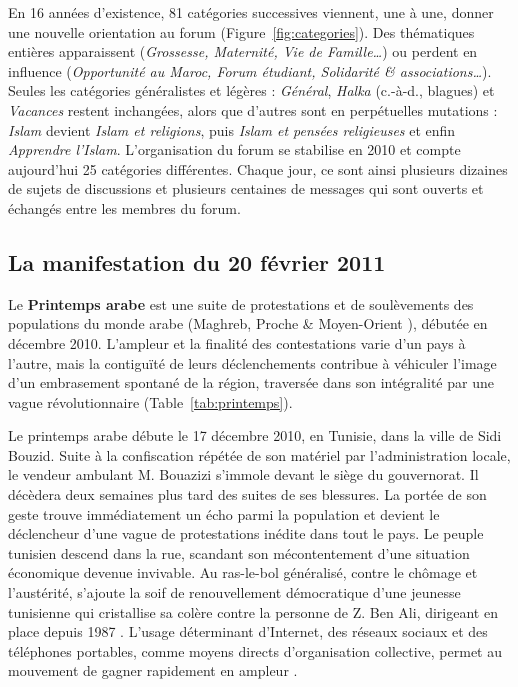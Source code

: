 \documentclass[symmetric,justified,marginals=raggedouter]{tufte-book}
\begin{document}
En 16 années d'existence, 81 catégories successives viennent, une à une, donner une nouvelle orientation au forum (Figure~\ref{fig:categories}). Des thématiques entières apparaissent (\textit{Grossesse, Maternité, Vie de Famille\ldots{}}) ou perdent en influence (\textit{Opportunité au Maroc, Forum étudiant, Solidarité \& associations\ldots{}}). Seules les catégories généralistes et légères : \textit{Général}, \textit{Halka} (c.-à-d., blagues) et \textit{Vacances} restent inchangées, alors que d'autres sont en perpétuelles mutations : \textit{Islam} devient \textit{Islam et religions}, puis \textit{Islam et pensées religieuses} et enfin \textit{Apprendre l'Islam}. L'orga\-nisation du forum se stabilise en 2010 et compte aujourd'hui 25 catégories différentes. Chaque jour, ce sont ainsi plusieurs dizaines de sujets de discussions et plusieurs centaines de messages qui sont ouverts et échangés entre les membres du forum. 

\subsection{La manifestation du 20 février 2011}

\noindent Le \textbf{Printemps arabe} est une suite de protestations et de soulèvements des populations du monde arabe (Maghreb, Proche \& Moyen-Orient ), débutée en décembre 2010. L'ampleur et la finalité des contestations varie d'un pays à l'autre, mais la contiguïté de leurs déclenchements contribue à véhiculer l'image d'un embrasement spontané de la région, traversée dans son intégralité par une vague révolutionnaire (Table~\ref{tab:printemps}).  

Le printemps arabe débute le 17 décembre 2010, en Tunisie, dans la ville de Sidi Bouzid. Suite à la confiscation répétée de son matériel par l'administration locale, le vendeur ambulant M. Bouazizi s'immole devant le siège du gouvernorat. Il décèdera deux semaines plus tard des suites de ses blessures. La portée de son geste trouve immédiatement un écho parmi la population et devient le déclencheur d'une vague de protestations inédite dans tout le pays. Le peuple tunisien descend dans la rue, scandant son mécontentement d'une situation économique devenue invivable. Au ras-le-bol généralisé, contre le chômage et l'austérité, s'ajoute la soif de renouvellement démocratique d'une jeunesse tunisienne qui cristallise sa colère contre la personne de Z. Ben Ali, dirigeant en place depuis 1987 \citep{salmon_29_2016}. L'usage déterminant d'Internet, des réseaux sociaux et des téléphones portables, comme moyens directs d'organisation collective, permet au mouvement de gagner rapidement en ampleur \citep{lotan_arab_2011, khondker_role_2011}.    
\end{document}
